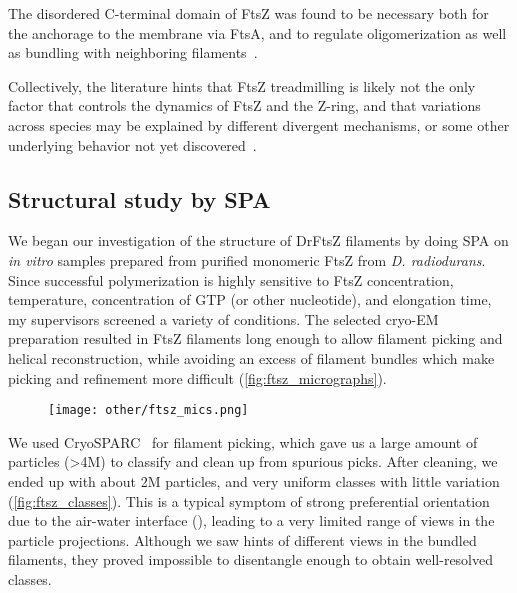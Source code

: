 The disordered C-terminal domain of FtsZ was found to be necessary both for the anchorage to the membrane via FtsA, and to regulate oligomerization as well as bundling with neighboring filaments~\cite{barrowsFtsZDynamicsBacterial2021}.

Collectively, the literature hints that FtsZ treadmilling is likely not the only factor that controls the dynamics of FtsZ and the Z-ring, and that variations across species may be explained by different divergent mechanisms, or some other underlying behavior not yet discovered~\cite{barrowsFtsZDynamicsBacterial2021}.

\subsection{Structural study by SPA}

We began our investigation of the structure of DrFtsZ filaments by doing SPA on \textit{in vitro} samples prepared from purified monomeric FtsZ from \textit{D. radiodurans}.
Since successful polymerization is highly sensitive to FtsZ concentration, temperature, concentration of GTP (or other nucleotide), and elongation time, my supervisors screened a variety of conditions.
The selected cryo-EM preparation resulted in FtsZ filaments long enough to allow filament picking and helical reconstruction, while avoiding an excess of filament bundles which make picking and refinement more difficult (\autoref{fig:ftsz_micrographs}).

\begin{figure}
    \centering
    \texttt{[image: other/ftsz\_mics.png]}
    \label{fig:ftsz_micrographs}
\end{figure}

We used CryoSPARC~\cite{punjaniCryoSPARCAlgorithmsRapid2017} for filament picking, which gave us a large amount of particles (>4M) to classify and clean up from spurious picks.
After cleaning, we ended up with about 2M particles, and very uniform classes with little variation (\autoref{fig:ftsz_classes}).
This is a typical symptom of strong preferential orientation due to the air-water interface (), leading to a very limited range of views in the particle projections.
Although we saw hints of different views in the bundled filaments, they proved impossible to disentangle enough to obtain well-resolved classes.

